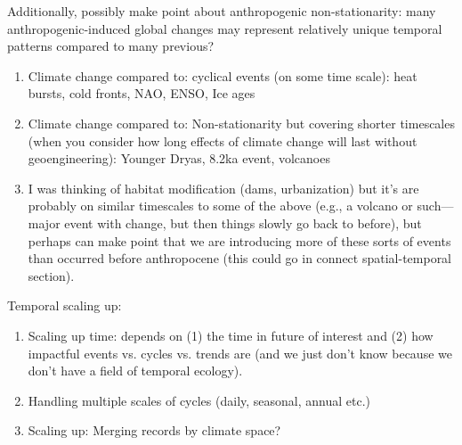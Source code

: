 \documentclass[11pt,a4paper]{article}
\begin{document}
\noindent Additionally, possibly make point about anthropogenic non-stationarity: many anthropogenic-induced global changes may represent relatively unique temporal patterns compared to many previous?
\begin{enumerate}
\item Climate change compared to: cyclical events (on some time scale): heat bursts, cold fronts, NAO, ENSO, Ice ages
\item Climate change compared to: Non-stationarity but covering shorter timescales (when you consider how long effects of climate change will last without geoengineering): Younger Dryas, 8.2ka event, volcanoes
\item I was thinking of habitat modification (dams, urbanization) but it's are probably on similar timescales to some of the above (e.g., a volcano or such---major event with change, but then things slowly go back to before), but perhaps can make point that we are introducing more of these sorts of events than occurred before anthropocene (this could go in connect spatial-temporal section).
\end{enumerate} 

\noindent Temporal scaling up:
\begin{enumerate}
\item Scaling up time: depends on (1) the time in future of interest and (2) how impactful events vs. cycles vs. trends are (and we just don't know because we don't have a field of temporal ecology).
\item Handling multiple scales of cycles (daily, seasonal, annual etc.)
\item Scaling up: Merging records by climate space?
\end{enumerate}
\end{document}
